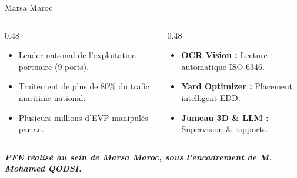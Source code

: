 \documentclass[aspectratio=169,french]{beamer}
\begin{document}
\begin{frame}{Marsa Maroc}
  \begin{columns}[t]
    \begin{column}{0.48\textwidth}
      \begin{tcolorbox}[cardstyle,title=\small\bfseries Identité]
        \small
        \begin{itemize}
          \item Leader national de l'exploitation portuaire (9 ports).
          \item Traitement de plus de 80\% du trafic maritime national.
          \item Plusieurs millions d'EVP manipulés par an.
        \end{itemize}
      \end{tcolorbox}
    \end{column}
    
    \begin{column}{0.48\textwidth}
      \begin{tcolorbox}[cardstyle,title=\small\bfseries Initiatives PFE Smart Port]
        \small
        \begin{itemize}
          \item \textbf{OCR Vision :} Lecture automatique ISO 6346.
          \item \textbf{Yard Optimizer :} Placement intelligent EDD.
          \item \textbf{Jumeau 3D \& LLM :} Supervision \& rapports.
        \end{itemize}
      \end{tcolorbox}
    \end{column}
  \end{columns}
  
  \vspace{0.4cm}
  \begin{center}
    \small\bfseries\itshape\textcolor{RefBlue}{PFE réalisé au sein de \textcolor{RefOrange}{Marsa Maroc}, sous l'encadrement de \textcolor{RefOrange}{M. Mohamed QODSI}.}
  \end{center}
\end{frame}
\end{document}
